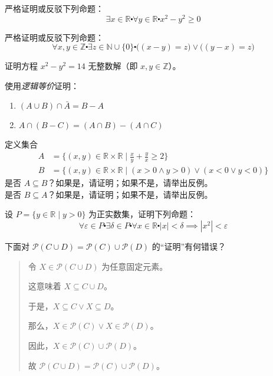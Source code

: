 \begin{exercise}
    严格证明或反驳下列命题：
    \[\exists x \in \mathbb{R} \centerdot \forall y \in \mathbb{R} \centerdot x^2 - y^2 \ge 0\]
\end{exercise}

\begin{exercise}
    严格证明或反驳下列命题：
    \[\forall x, y \in \mathbb{Z} \centerdot \exists z \in \mathbb{N} \cup \{0\} \centerdot \big((x - y) = z\big) \lor \big((y - x) = z\big)\]
\end{exercise}

\begin{exercise}
    证明方程 $x^2-y^2=14$ 无整数解（即 $x, y \in \mathbb{Z}$）。
\end{exercise}

\begin{exercise}
    使用\emph{逻辑等价}证明：
    \begin{enumerate}[label=(\alph*)]
        \item $(A \cup B) \cap \bar{A} = B - A$
        \item $A \cap (B - C) = (A \cap B) - (A \cap C)$
    \end{enumerate}  
\end{exercise}

\begin{exercise}
    定义集合
    \begin{align*}
        A &= \Big\{(x, y) \in \mathbb{R} \times \mathbb{R} \mid \frac{x}{y}+\frac{y}{x} \ge 2\Big\} \\
        B &= \{(x, y) \in \mathbb{R} \times \mathbb{R} \mid (x>0 \land y>0) \lor (x<0 \lor y<0)\}
    \end{align*}
    是否 $A \subseteq B$？如果是，请证明；如果不是，请举出反例。\\
    是否 $B \subseteq A$？如果是，请证明；如果不是，请举出反例。
\end{exercise}

\begin{exercise}
    设 $P = \{y \in \mathbb{R} \mid y > 0\}$ 为正实数集，证明下列命题：
    \[\forall \varepsilon \in P \centerdot \exists \delta \in P \centerdot \forall x \in \mathbb{R} \centerdot |x| < \delta \implies|x^2| < \varepsilon\]
\end{exercise}

\begin{exercise}
    下面对 $\mathcal{P}(C \cup D) = \mathcal{P}(C) \cup \mathcal{P}(D)$ 的``证明''有何错误？
    \begin{quote}
        令 $X \in \mathcal{P}(C \cup D)$ 为任意固定元素。

        这意味着 $X \subseteq C \cup D$。

        于是，$X \subseteq C \lor X \subseteq D$。

        那么，$X \in \mathcal{P}(C) \lor X \in \mathcal{P}(D)$。
        
        因此，$X \in \mathcal{P}(C) \cup \mathcal{P}(D)$。

        故 $\mathcal{P}(C \cup D) = \mathcal{P}(C) \cup \mathcal{P}(D)$。
    \end{quote}
\end{exercise}

